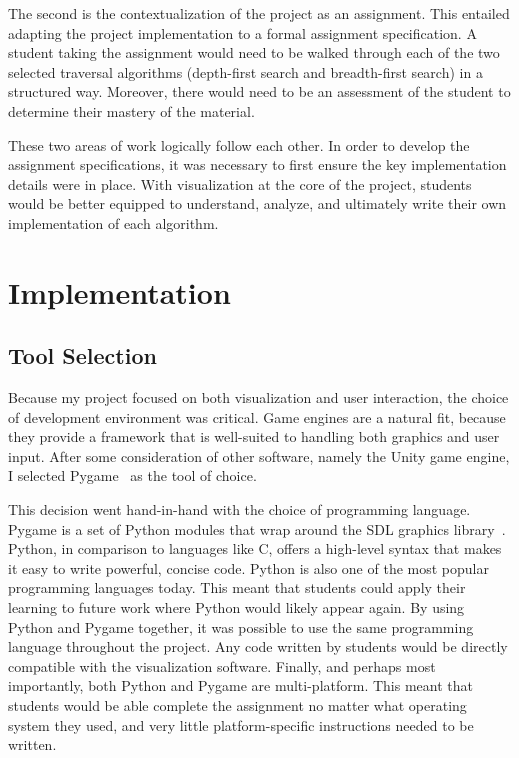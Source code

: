 \documentclass[pageno]{jpaper}
\begin{document}
The second is the contextualization of the project as an assignment. This entailed adapting the project implementation to a formal assignment specification. A student taking the assignment would need to be walked through each of the two selected traversal algorithms (depth-first search and breadth-first search) in a structured way. Moreover, there would need to be an assessment of the student to determine their mastery of the material.

These two areas of work logically follow each other. In order to develop the assignment specifications, it was necessary to first ensure the key implementation details were in place. With visualization at the core of the project, students would be better equipped to understand, analyze, and ultimately write their own implementation of each algorithm.

\section{Implementation}

\subsection{Tool Selection}

Because my project focused on both visualization and user interaction, the choice of development environment was critical. Game engines are a natural fit, because they provide a framework that is well-suited to handling both graphics and user input. After some consideration of other software, namely the Unity game engine, I selected Pygame~\cite{pygame} as the tool of choice.

This decision went hand-in-hand with the choice of programming language. Pygame is a set of Python modules that wrap around the SDL graphics library~\cite{pygame}. Python, in comparison to languages like C, offers a high-level syntax that makes it easy to write powerful, concise code. Python is also one of the most popular programming languages today. This meant that students could apply their learning to future work where Python would likely appear again. By using Python and Pygame together, it was possible to use the same programming language throughout the project. Any code written by students would be directly compatible with the visualization software. Finally, and perhaps most importantly, both Python and Pygame are multi-platform. This meant that students would be able complete the assignment no matter what operating system they used, and very little platform-specific instructions needed to be written.
\end{document}
